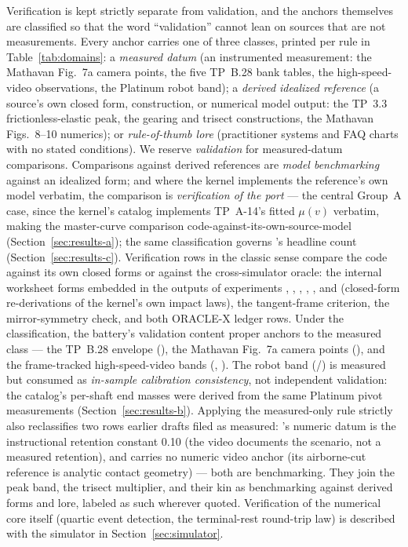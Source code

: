 Verification is kept strictly separate from validation, and the anchors
themselves are classified so that the word ``validation'' cannot lean on
sources that are not measurements. Every anchor carries one of three
classes, printed per rule in Table~\ref{tab:domains}: a \emph{measured
datum} (an instrumented measurement: the Mathavan Fig.~7a camera points,
the five TP~B.28 bank tables, the high-speed-video observations, the
Platinum robot band); a \emph{derived idealized reference} (a source's own
closed form, construction, or numerical model output: the TP~3.3
frictionless-elastic peak, the gearing and trisect constructions, the
Mathavan Figs.~8--10 numerics); or \emph{rule-of-thumb lore} (practitioner
systems and FAQ charts with no stated conditions). We reserve
\emph{validation} for measured-datum comparisons. Comparisons against
derived references are \emph{model benchmarking} against an idealized
form; and where the kernel implements the reference's own model verbatim,
the comparison is \emph{verification of the port} --- the central Group~A
case, since the kernel's catalog implements TP~A-14's fitted $\mu(v)$
verbatim, making the  master-curve comparison
code-against-its-own-source-model (Section~\ref{sec:results-a}); the same
classification governs 's headline count
(Section~\ref{sec:results-c}). Verification rows in the classic sense
compare the code against its own closed forms or against the
cross-simulator oracle: the internal worksheet forms embedded in the
outputs of experiments , , , ,
, and  (closed-form re-derivations of the kernel's own
impact laws), the  tangent-frame criterion, the 
mirror-symmetry check, and both ORACLE-X ledger rows. Under the
classification, the battery's validation content proper anchors to the
measured class --- the TP~B.28 envelope (), the Mathavan Fig.~7a
camera points (), and the frame-tracked high-speed-video bands
(, ). The robot band (/) is
measured but consumed as \emph{in-sample calibration consistency}, not
independent validation: the catalog's per-shaft end masses were derived
from the same Platinum pivot measurements
(Section~\ref{sec:results-b}). Applying the measured-only rule strictly
also reclassifies two rows earlier drafts filed as measured:
's numeric datum is the instructional retention constant 0.10
(the video documents the scenario, not a measured retention), and
 carries no numeric video anchor (its airborne-cut reference
is analytic contact geometry) --- both are benchmarking. They join the
 peak band, the trisect multiplier, and their kin as
benchmarking against derived forms and lore, labeled as such wherever
quoted. Verification of the numerical
core itself (quartic event detection, the terminal-rest round-trip law) is
described with the simulator in Section~\ref{sec:simulator}.

